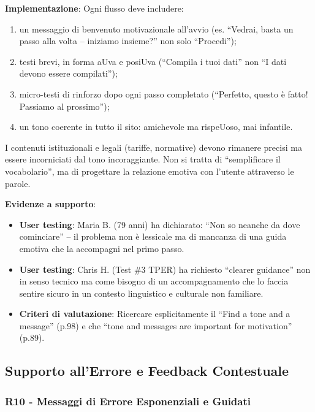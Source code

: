 \documentclass[11pt,a4paper]{article}
\begin{document}
\textbf{Implementazione}: Ogni flusso deve includere:
\begin{enumerate}
    \item un messaggio di benvenuto motivazionale all'avvio (es. ``Vedrai,
    basta un passo alla volta -- iniziamo insieme?'' non solo ``Procedi'');
    \item testi brevi, in forma aUva e posiUva (``Compila i tuoi dati''
    non ``I dati devono essere compilati'');
    \item micro-testi di rinforzo dopo ogni passo completato (``Perfetto,
    questo \`e fatto! Passiamo al prossimo'');
    \item un tono coerente in tutto il sito: amichevole ma rispeUoso,
    mai infantile.
\end{enumerate}
I contenuti istituzionali e legali (tariffe, normative) devono rimanere
precisi ma essere incorniciati dal tono incoraggiante. Non si tratta di
``semplificare il vocabolario'', ma di progettare la relazione emotiva
con l'utente attraverso le parole.

\textbf{Evidenze a supporto}:
\begin{itemize}
    \item \textbf{User testing}: Maria B. (79 anni) ha dichiarato: ``Non so
    neanche da dove cominciare'' -- il problema non \`e lessicale ma di
    mancanza di una guida emotiva che la accompagni nel primo passo.
    \item \textbf{User testing}: Chris H. (Test \#3 TPER) ha richiesto
    ``clearer guidance'' non in senso tecnico ma come bisogno di un
    accompagnamento che lo faccia sentire sicuro in un contesto
    linguistico e culturale non familiare.
    \item \textbf{Criteri di valutazione}: Ricercare
    esplicitamente il ``Find a tone and a message'' (p.98) e che
    ``tone and messages are important for motivation'' (p.89).
\end{itemize}



\subsection{Supporto all'Errore e Feedback Contestuale}

\subsubsection{R10 - Messaggi di Errore Esponenziali e Guidati}
\label{rec:R10}
\end{document}
